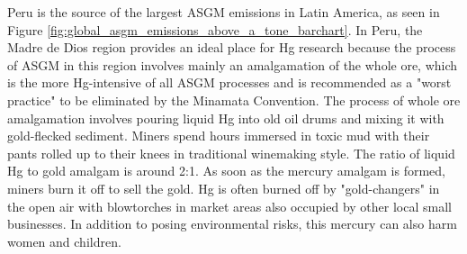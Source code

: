 \begin{flushleft}
Peru is the source of the largest ASGM emissions in Latin America, as seen in Figure \ref{fig:global_asgm_emissions_above_a_tone_barchart}. In Peru, the Madre de Dios region provides an ideal place for Hg research because the process of ASGM in this region involves mainly an amalgamation of the whole ore, which is the more Hg-intensive of all ASGM processes and is recommended as a "worst practice" to be eliminated by the Minamata Convention\cite{unep_global_2017}. The process of whole ore amalgamation involves pouring liquid Hg into old oil drums and mixing it with gold-flecked sediment. Miners spend hours immersed in toxic mud with their pants rolled up to their knees in traditional winemaking style. The ratio of liquid Hg to gold amalgam is around 2:1\cite{fraser_peruvian_2009,swenson_gold_2011,veiga_origin_2006}. As soon as the mercury amalgam is formed, miners burn it off to sell the gold. Hg is often burned off by "gold-changers" in the open air with blowtorches in market areas also occupied by other local small businesses. In addition to posing environmental risks, this mercury can also harm women and children\cite{diringer_river_2015}. 
\end{flushleft}

